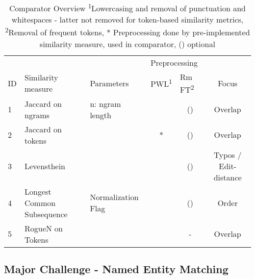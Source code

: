 \documentclass[11pt,titlepage,oneside,openany]{book}
\begin{document}
\begin{table}[t]
	
	
	\begin{tabular}{lllccc}
		& \multicolumn{2}{l}{}                              & \multicolumn{2}{l}{Preprocessing}                   & \\
		ID & Similarity   measure       & Parameters           & \multicolumn{1}{l}{PWL\textsuperscript{1}} & \multicolumn{1}{l}{Rm FT\textsuperscript{2}} & Focus\\
		1  & Jaccard on ngrams          & n: ngram   length    & \checked & (\checked)                     & Overlap\\
		2  & Jaccard on tokens          &                      & *                       & (\checked)                       &Overlap\\
		3  & Levensthein                &                      & \checked & (\checked)                       &Typos / Edit-distance\\
		4  & Longest Common Subsequence & Normalization   Flag & \checked & (\checked)                       & Order\\
		5  & RogueN on Tokens \cite{lin_rouge_2004} & & \checked & -  & Overlap                      
	\end{tabular}

\caption[Comparator Overview]%
{Comparator Overview \small\medspace\medspace \textsuperscript{1}Lowercasing and removal of punctuation and whitespaces -  latter not removed for token-based similarity metrics, \textsuperscript{2}Removal of frequent tokens, * Preprocessing done by pre-implemented similarity measure, \checked \space used in comparator, (\checked) optional}
\label{table:comparators}

\end{table}

\subsection{Major Challenge - Named Entity Matching}
\end{document}
